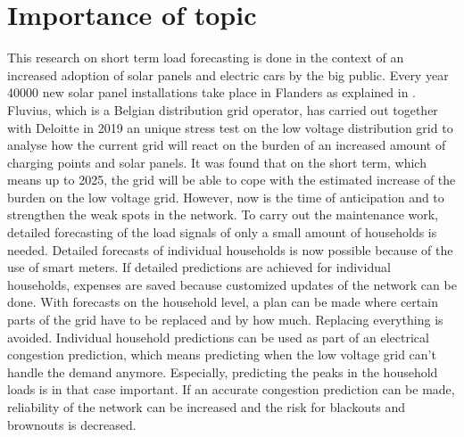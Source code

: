 \section{Importance of topic}
This research on short term load forecasting is done in the context of an increased adoption of solar panels and electric cars by the big public. Every year 40000 new solar panel installations take place in Flanders as explained in \cite{Lemmens2019}. Fluvius, which is a Belgian distribution grid operator, has carried out together with Deloitte in 2019 an unique stress test on the low voltage distribution grid to analyse how the current grid will react on the burden of an increased amount of charging points and solar panels. It was found that on the short term, which means up to 2025, the grid will be able to cope with the estimated increase of the burden on the low voltage grid. However, now is the time of anticipation and to strengthen the weak spots in the network. To carry out the maintenance work, detailed forecasting of the load signals of only a small amount of households is needed. Detailed forecasts of individual households is now possible because of the use of smart meters. If detailed predictions are achieved for individual households, expenses are saved because customized updates of the network can be done. With forecasts on the household level, a plan can be made where certain parts of the grid have to be replaced and by how much. Replacing everything is avoided. Individual household predictions can be used as part of an electrical congestion prediction, which means predicting when the low voltage grid can't handle the demand anymore. Especially, predicting the peaks in the household loads is in that case important. If an accurate congestion prediction can be made, reliability of the network can be increased and the risk for blackouts and brownouts is decreased.\\

